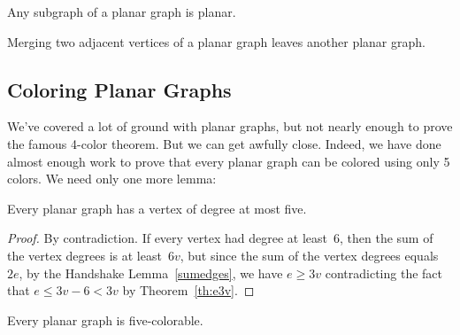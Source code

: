 \begin{lemma}\label{planar-subgraph}
  Any subgraph of a planar graph is planar.
\end{lemma}

\begin{lemma}\label{mergelem}
Merging two adjacent vertices of a planar graph leaves another planar
graph.
\end{lemma}

\subsection{Coloring Planar Graphs}

We've covered a lot of ground with planar graphs, but not nearly
enough to prove the famous 4-color theorem.  But we can get awfully
close.  Indeed, we have done almost enough work to prove that every
planar graph can be colored using only 5 colors.  We need only one
more lemma:
\begin{lemma}\label{lem:pg5}
Every planar graph has a vertex of degree at most five.
\end{lemma}

\begin{proof}
By contradiction.
If every vertex had degree at least~6, then the sum of the vertex
degrees is at least~$6v$, but since the sum of the vertex degrees
equals~$2e$, by the Handshake Lemma~\ref{sumedges}, we have $e
\ge 3v$ contradicting the fact that $e \le 3v - 6 < 3v$ by
Theorem~\ref{th:e3v}.
\end{proof}

\begin{theorem}
Every planar graph is five-colorable.
\end{theorem}


